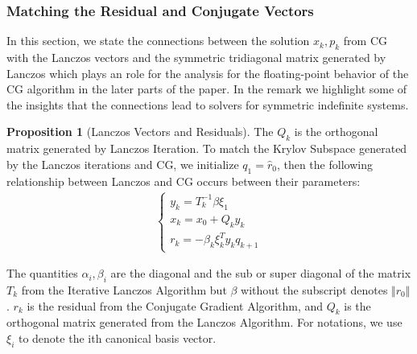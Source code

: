 \documentclass[]{article}
\theoremstyle{definition}
\newtheorem{prop}{Proposition}[section]  %
\begin{document}
        \subsubsection{Matching the Residual and Conjugate Vectors}
            In this section, we state the connections between the solution $x_k, p_k$ from CG with the Lanczos vectors and the symmetric tridiagonal matrix generated by Lanczos which plays an  role for the analysis for the floating-point behavior of the CG algorithm in the later parts of the paper. In the remark we highlight some of the insights that the connections lead to solvers for symmetric indefinite systems. 
            \begin{prop}[Lanczos Vectors and Residuals]\label{prop:Lanczos_Vectors_and_Residuals}
                The $Q_k$ is the orthogonal matrix generated by Lanczos Iteration. To match the Krylov Subspace generated by the Lanczos iterations and CG, we initialize $q_1 = \hat{r}_0$, then the following relationship between Lanczos and CG occurs between their parameters: 
                \begin{align}
                    \begin{cases}
                        y_k = T^{-1}_k \beta\xi_1
                        \\
                        x_k = x_0 + Q_k y_k
                        \\
                        r_k = -\beta_{k}\xi_k^T y_k q_{k +1}
                    \end{cases}
                \end{align}
            \end{prop}
            The quantities $\alpha_i, \beta_i$ are the diagonal and the sub or super diagonal of the matrix $T_k$ from the Iterative Lanczos Algorithm but $\beta$ without the subscript denotes $\Vert r_0\Vert$. $r_k$ is the residual from the Conjugate Gradient Algorithm, and $Q_k$ is the orthogonal matrix generated from the Lanczos Algorithm. For notations, we use $\xi_i$ to denote the ith canonical basis vector. 
\end{document}
